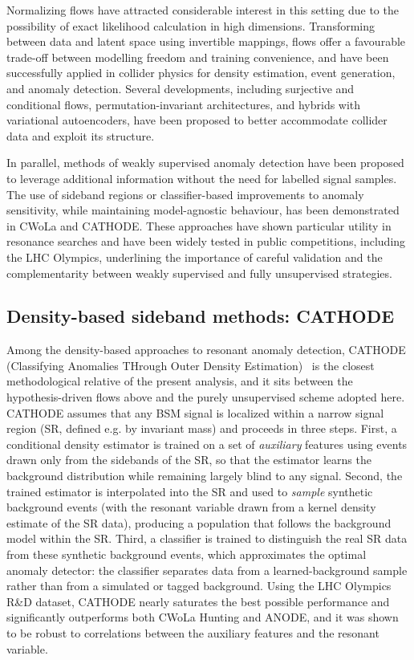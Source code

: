 \documentclass[11pt,a4paper,twocolumn]{article}
\begin{document}
Normalizing flows have attracted considerable interest in this setting due to the possibility of exact likelihood calculation in high dimensions. Transforming between data and latent space using invertible mappings, flows offer a favourable trade-off between modelling freedom and training convenience, and have been successfully applied in collider physics for density estimation, event generation, and anomaly detection. Several developments, including surjective and conditional flows, permutation-invariant architectures, and hybrids with variational autoencoders, have been proposed to better accommodate collider data and exploit its structure.

In parallel, methods of weakly supervised anomaly detection have been proposed to leverage additional information without the need for labelled signal samples. The use of sideband regions or classifier-based improvements to anomaly sensitivity, while maintaining model-agnostic behaviour, has been demonstrated in CWoLa and CATHODE. These approaches have shown particular utility in resonance searches and have been widely tested in public competitions, including the LHC Olympics, underlining the importance of careful validation and the complementarity between weakly supervised and fully unsupervised strategies.

\subsection{Density-based sideband methods: CATHODE}
\label{sec:lit-cathode}

Among the density-based approaches to resonant anomaly detection, CATHODE (Classifying Anomalies THrough Outer Density Estimation)~\cite{Hallin2022CATHODE} is the closest methodological relative of the present analysis, and it sits between the hypothesis-driven flows above and the purely unsupervised scheme adopted here. CATHODE assumes that any BSM signal is localized within a narrow signal region (SR, defined e.g. by invariant mass) and proceeds in three steps. First, a conditional density estimator is trained on a set of \emph{auxiliary} features using events drawn only from the sidebands of the SR, so that the estimator learns the background distribution while remaining largely blind to any signal. Second, the trained estimator is interpolated into the SR and used to \emph{sample} synthetic background events (with the resonant variable drawn from a kernel density estimate of the SR data), producing a population that follows the background model within the SR. Third, a classifier is trained to distinguish the real SR data from these synthetic background events, which approximates the optimal anomaly detector: the classifier separates data from a learned-background sample rather than from a simulated or tagged background. Using the LHC Olympics R\&D dataset, CATHODE nearly saturates the best possible performance and significantly outperforms both CWoLa Hunting and ANODE, and it was shown to be robust to correlations between the auxiliary features and the resonant variable.
\end{document}
